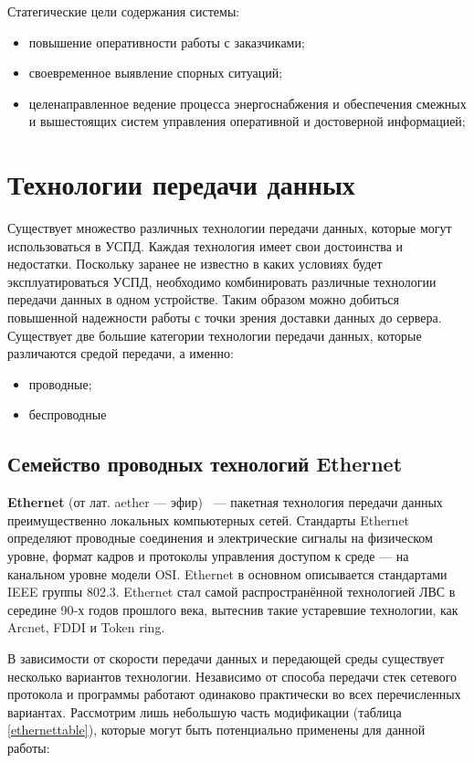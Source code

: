 \documentclass[utf8,14pt, coursreport]{G7-32}
\begin{document}
Статегические цели содержания системы:
\begin{itemize}
\item повышение оперативности работы с заказчиками;
\item своевременное выявление спорных ситуаций;
\item целенаправленное ведение процесса энергоснабжения и обеспечения смежных и вышестоящих систем управления оперативной и достоверной информацией;
\end{itemize}

\section{Технологии передачи данных}

Существует множество различных технологии передачи данных, которые могут использоваться в УСПД. Каждая технология имеет свои достоинства и недостатки. Поскольку заранее не известно в каких условиях будет эксплуатироваться УСПД, необходимо комбинировать различные технологии передачи данных в одном устройстве. Таким образом можно добиться повышенной надежности работы с точки зрения доставки данных до сервера. Существует две большие категории технологии передачи данных, которые различаются средой передачи, а именно:
\begin{itemize}
\item проводные;
\item беспроводные
\end{itemize}

\subsection{Семейство проводных технологий Ethernet}

\textbf{Ethernet} (от лат. aether --- эфир) ~--- пакетная технология передачи данных преимущественно локальных компьютерных сетей. Стандарты Ethernet определяют проводные соединения и электрические сигналы на физическом уровне, формат кадров и протоколы управления доступом к среде — на канальном уровне модели OSI. Ethernet в основном описывается стандартами IEEE группы 802.3. Ethernet стал самой распространённой технологией ЛВС в середине 90-х годов прошлого века, вытеснив такие устаревшие технологии, как Arcnet, FDDI и Token ring\cite{ethernetinfo}.

В зависимости от скорости передачи данных и передающей среды существует несколько вариантов технологии. Независимо от способа передачи стек сетевого протокола и программы работают одинаково практически во всех перечисленных вариантах. Рассмотрим лишь небольшую часть модификации (таблица \ref{ethernettable}), которые могут быть потенциально применены для данной работы:
\end{document}
